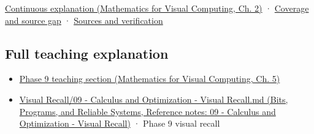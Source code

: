 \href{../02-Mathematics-for-Visual-Computing/main.pdf\#nameddest=01-foundations-i-ch018-keep-the-promises-visible-while-moving-between-representations}{Continuous explanation (Mathematics for Visual Computing, Ch. 2)} · \hyperref[appendix-fd090d982a15-phase-7---parts-601-700]{Coverage and source gap} · \hyperref[appendix-a103e7846d21-phase-7---source-analysis-and-verification]{Sources and verification}

\subsection{Full teaching explanation}\label{appendix-ab31ef447dbf-full-teaching-explanation}

\begin{itemize}
\tightlist
\item
  \href{../02-Mathematics-for-Visual-Computing/main.pdf\#nameddest=02-foundations-ii-ch021-jacobians-curvature-and-local-approximation}{Phase 9 teaching section (Mathematics for Visual Computing, Ch. 5)}
\item
  \href{../01-Bits-Programs-and-Reliable-Systems/main.pdf\#nameddest=appendix-adf48f5dc5c1}{Visual Recall/09 - Calculus and Optimization - Visual Recall.md (Bits, Programs, and Reliable Systems, Reference notes: 09 - Calculus and Optimization - Visual Recall)} · Phase 9 visual recall
\end{itemize}
